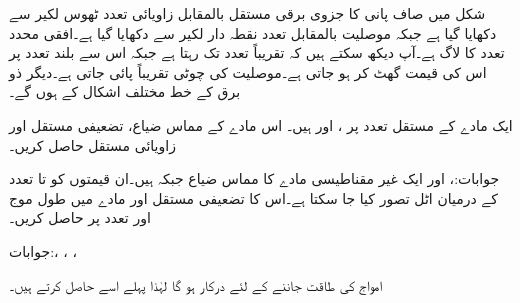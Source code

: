 شکل  میں صاف پانی کا جزوی برقی مستقل  بالمقابل زاویائی تعدد  ٹھوس لکیر سے دکھایا گیا ہے جبکہ موصلیت بالمقابل تعدد نقطہ دار لکیر سے دکھایا گیا ہے۔افقی محدد تعدد کا لاگ ہے۔آپ دیکھ سکتے ہیں کہ تقریباً  تعدد تک  رہتا ہے جبکہ اس سے بلند تعدد پر اس کی قیمت گھٹ کر  ہو جاتی ہے۔موصلیت کی چوٹی تقریباً  پائی جاتی ہے۔دیگر ذو برق کے خط مختلف اشکال کے ہوں گے۔

ایک مادے  کے مستقل  تعدد پر  ،  اور  ہیں۔ اس مادے کے مماس ضیاع، تضعیفی مستقل اور زاویائی مستقل حاصل کریں۔

جوابات:،  اور 
ایک غیر مقناطیسی مادے کا مماس ضیاع  جبکہ  ہیں۔ان قیمتوں کو  تا  تعدد کے درمیان اٹل تصور کیا جا سکتا ہے۔اس کا تضعیفی مستقل اور  مادے میں طول موج   اور  تعدد پر حاصل کریں۔

جوابات:، ، ،  

امواج کی طاقت جاننے کے لئے    درکار ہو گا لہٰذا پہلے اسے حاصل کرتے ہیں۔

